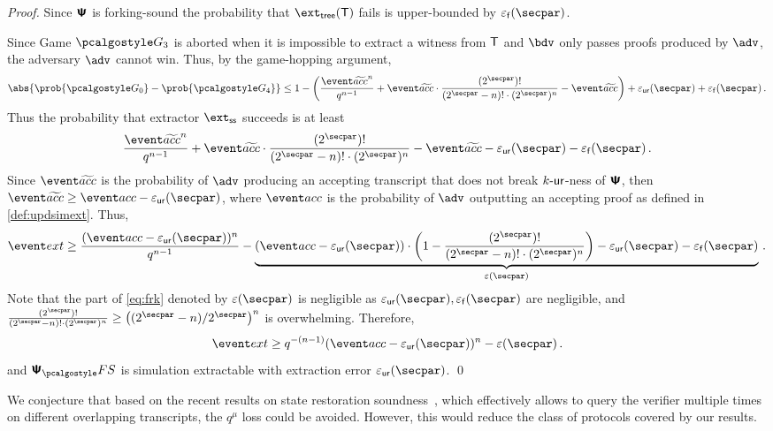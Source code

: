\begin{proof}
		Since $\bm{\mathsf{\Psi}}$ is forking-sound the probability that $\extt(\tree)$
		fails is upper-bounded by $\epsss(\secpar)$.
		
		Since Game $\game{3}$ is aborted when it is impossible to extract a witness from
		$\mathsf{T}$ and $\bdv$ only passes proofs produced by $\adv$, the adversary $\advse$ cannot
		win. Thus, by the game-hopping argument,
		\[
		\abs{\prob{\game{0}} - \prob{\game{4}}} \leq 1 -
		\left(\frac{\waccProb^{n}}{q^{n - 1}} + \waccProb \cdot \frac{(2^\secpar)
			!}{(2^\secpar - n)! \cdot (2^\secpar)^{n}} - \waccProb\right) + \epsur(\secpar) +
		\epsss(\secpar)\,.
		\]
		Thus the probability that extractor $\extss$ succeeds is at least
		\[
		\frac{\waccProb^{n}}{q^{n - 1}} + \waccProb \cdot \frac{(2^\secpar)
			!}{(2^\secpar - n)! \cdot (2^\secpar)^{n}} - \waccProb - \epsur(\secpar) 
		- \epsss(\secpar)\,.
		\]
		Since $\waccProb$ is the probability of $\advse$ producing an accepting transcript
		that does not break ${k\text{-}\mathsf{ur}}$-ness of $\bm{\mathsf{\Psi}}$, then $\waccProb \geq \accProb -
		\epsur(\secpar)$, where $\accProb$ is the probability of $\advse$ outputting an accepting
		proof as defined in \cref{def:updsimext}. Thus, 
		\begin{equation}
		\label{eq:frk}
		\extProb \geq \frac{(\accProb - \epsur(\secpar))^{n}}{q^{n - 1}} -
		\underbrace{(\accProb - \epsur(\secpar)) \cdot \left( 1 - \frac{(2^\secpar)
				!}{(2^\secpar - n)! \cdot (2^\secpar)^{n}}\right) - \epsur(\secpar) -
			\epsss(\secpar)}_{\eps(\secpar)}\,.
		\end{equation}
		Note that the part of \cref{eq:frk} denoted by $\eps(\secpar)$ is negligible as
		$\epsur(\secpar), \epsss(\secpar)$ are negligible, and
		$\frac{(2^\secpar) !}{(2^\secpar - n)! \cdot (2^\secpar)^{n}} \geq
		\left(\infrac{(2^\secpar - n)}{2^\secpar}\right)^{n}$ is overwhelming.  Therefore,
		\[
		\extProb \geq q^{-(n - 1)} (\accProb - \epsur(\secpar))^{n} -\eps(\secpar)\,.
		\] 
		and $\psfs$ is simulation extractable with extraction error $\epsur(\secpar)$.
	\qed
\end{proof}


We conjecture that based on the recent results on state restoration soundness~\cite{C:GhoTes21}, which effectively allows to query the verifier multiple times on different overlapping transcripts, the $q^{\mu}$ loss could be avoided. However, this would reduce the class of protocols covered by our results. 

